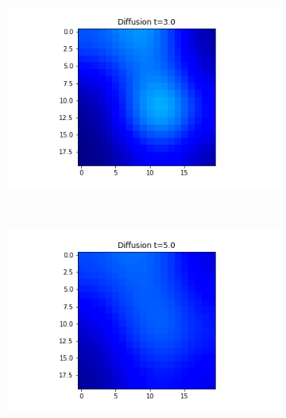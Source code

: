 \documentclass[10pt,a4paper]{article}
\begin{document}
\begin{figure}[!h]
\begin{subfigure}[b]{0.25\textwidth}
	\end{subfigure}~
    \begin{subfigure}[b]{0.25\textwidth}
    	\includegraphics[width= \textwidth]{images/grid-t3-x0.png}
    \end{subfigure}~
    \begin{subfigure}[b]{0.25\textwidth}
    	\includegraphics[width= \textwidth]{images/grid-t5-x0.png}
    \end{subfigure}
\end{figure}
\end{document}
